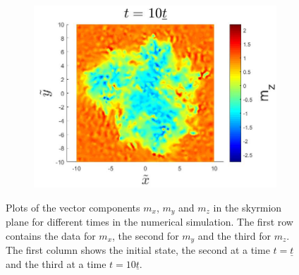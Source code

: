 \begin{figure}[h!]
\begin{subfigure}{.3\textwidth}
  \includegraphics[width=\linewidth]{Figures/StaticSkyrmionMzT10.jpg}
  \caption{}
  \label{fig:StaticSkyrmionMzT10}
\end{subfigure}
\caption{Plots of the vector components $m_x$, $m_y$ and $m_z$ in the skyrmion plane for different times in the numerical simulation. The first row contains the data for $m_x$, the second for $m_y$ and the third for $m_z$. The first column shows the initial state, the second at a time $t=\underline{t}$ and the third at a time $t=10\underline{t}$.}
\label{fig:StaticSkyrmion}
\end{figure}
